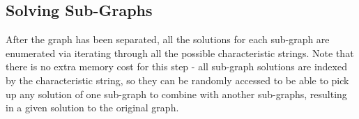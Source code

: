 \documentclass[conference]{IEEEtran}
\begin{document}
\subsection{Solving Sub-Graphs}
After the graph has been separated, all the solutions for each sub-graph are enumerated via iterating through all the possible characteristic strings. 
Note that there is no extra memory cost for this step - all sub-graph solutions are indexed by the characteristic string, so they can be randomly accessed 
to be able to pick up any solution of one sub-graph to combine with another sub-graphs, resulting in a given solution to the original graph. 

 
\end{document}
